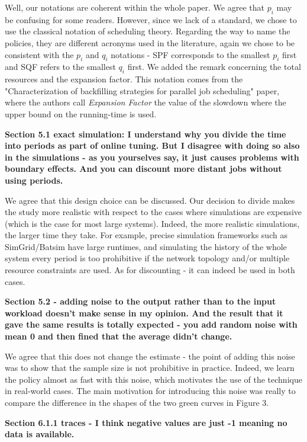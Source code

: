 \documentclass[]{article}
\begin{document}
Well, our notations are coherent within the whole paper.
We agree that $p_i$ may be confusing for some readers.
However, since we lack of a standard, we chose
to use the classical notation of scheduling theory. 
Regarding the way to name the policies, they are different acronyms used in the literature,
again we chose to be consistent with the $p_i$ and $q_i$ notations - SPF corresponds to the
smallest $p_i$ first and SQF refers to the smallest $q_i$ first.  We added the remark
concerning the total resources and the expansion factor. This notation comes
from the "Characterization of backfilling strategies for parallel job
scheduling" paper, where the authors call \textit{Expansion Factor} the value of the
slowdown where the upper bound on the running-time is used. 
\medskip

\textbf{Section 5.1 exact simulation: I understand why you divide the time into
    periods as part of online tuning. But I disagree with doing so also in the
    simulations - as you yourselves say, it just causes problems with boundary
    effects.  And you can discount more distant jobs without using periods.}

We agree that this design choice can be discussed. Our decision to divide
makes the study more realistic with respect to the cases where simulations are
expensive (which is the case for most large systems).  Indeed, the more realistic simulations, 
the larger time they take. For example, precise simulation frameworks such
as SimGrid/Batsim have large runtimes, and simulating the history of the whole
system every period is too prohibitive if the network topology and/or multiple
resource constraints are used. As for discounting - it can indeed be used
in both cases.
\medskip

\textbf{Section 5.2 - adding noise to the output rather than to the input
    workload doesn't make sense in my opinion. And the result that it gave the
    same results is totally expected - you add random noise with mean 0 and
    then fined that the average didn't change.}

We agree that this does not change the estimate - the point of adding 
this noise was to show that the sample size is not prohibitive in practice.
Indeed, we learn the policy almost as fast with this noise, which
motivates the use of the technique in real-world cases. The main motivation for introducing this noise
was really to compare the difference in the shapes of the two green curves
in Figure 3.
\medskip

\textbf{Section 6.1.1 traces - I think negative values are just -1 meaning no data is available.}
\end{document}
